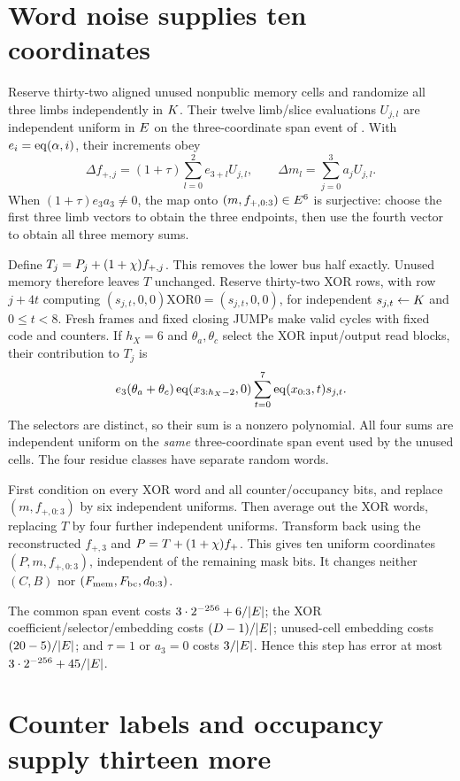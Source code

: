 \documentclass[11pt]{article}
\begin{document}
\section{Word noise supplies ten coordinates}

Reserve thirty-two aligned unused nonpublic memory cells and randomize all three limbs independently in $K$. Their twelve limb/slice evaluations $U_{j,l}$ are independent uniform in $E$ on the three-coordinate span event of . With $e_i=\operatorname{eq}(\alpha,i)$, their increments obey
\[
 \Delta f_{+,j}=(1+\tau)\sum_{l=0}^2 e_{3+l}U_{j,l},
 \qquad \Delta m_l=\sum_{j=0}^3a_jU_{j,l}.
\]
When $(1+\tau)e_3a_3\ne0$, the map onto $(m,f_{+,0:3})\in E^6$ is surjective: choose the first three limb vectors to obtain the three endpoints, then use the fourth vector to obtain all three memory sums.

Define $T_j=P_j+(1+\chi)f_{+,j}$. This removes the lower bus half exactly. Unused memory therefore leaves $T$ unchanged. Reserve thirty-two XOR rows, with row $j+4t$ computing $(s_{j,t},0,0)\mathbin{\mathrm{XOR}}0=(s_{j,t},0,0)$, for independent $s_{j,t}\gets K$ and $0\le t<8$. Fresh frames and fixed closing JUMPs make valid cycles with fixed code and counters. If $h_X=6$ and $\theta_a,\theta_c$ select the XOR input/output read blocks, their contribution to $T_j$ is
\[
 e_3(\theta_a+\theta_c)
 \operatorname{eq}(x_{3:h_X-2},0)
 \sum_{t=0}^7\operatorname{eq}(x_{0:3},t)s_{j,t}.
\]
The selectors are distinct, so their sum is a nonzero polynomial. All four sums are independent uniform on the \emph{same} three-coordinate span event used by the unused cells. The four residue classes have separate random words.

First condition on every XOR word and all counter/occupancy bits, and replace $(m,f_{+,0:3})$ by six independent uniforms. Then average out the XOR words, replacing $T$ by four further independent uniforms. Transform back using the reconstructed $f_{+,3}$ and $P=T+(1+\chi)f_+$. This gives ten uniform coordinates $(P,m,f_{+,0:3})$, independent of the remaining mask bits. It changes neither $(C,B)$ nor $(F_{\rm mem},F_{\rm bc},d_{0:3})$.

The common span event costs $3\cdot2^{-256}+6/|E|$; the XOR coefficient/selector/embedding costs $(D-1)/|E|$; unused-cell embedding costs $(20-5)/|E|$; and $\tau=1$ or $a_3=0$ costs $3/|E|$. Hence this step has error at most $3\cdot2^{-256}+45/|E|$.

\section{Counter labels and occupancy supply thirteen more}
\end{document}
